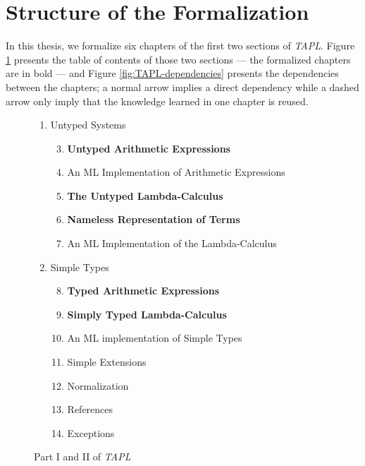 \section{Structure of the Formalization}
\label{sec:structure-of-formalization}

In this thesis, we formalize six chapters of the first two sections of \emph{TAPL}. Figure
\ref{fig:TAPL-toc} presents the table of contents of those two sections --- the formalized chapters
are in bold --- and Figure \ref{fig:TAPL-dependencies} presents the dependencies between the
chapters; a normal arrow implies a direct dependency while a dashed arrow only imply that the
knowledge learned in one chapter is reused.

\begin{figure}[h]
  \footnotesize
  \centering
  \begin{varwidth}{\textwidth}
    \begin{enumerate}[label=\Roman*]
      \itemsep 1pt
      \item Untyped Systems \hfill
        \begin{enumerate}[label=§ \arabic*]
          \setcounter{enumii}{2}
          \item \textbf{Untyped Arithmetic Expressions}
          \item An ML Implementation of Arithmetic Expressions
          \item \textbf{The Untyped Lambda-Calculus}
          \item \textbf{Nameless Representation of Terms}
          \item An ML Implementation of the Lambda-Calculus
        \end{enumerate}
      \item Simple Types \hfill
        \begin{enumerate}[label=§ \arabic*]
          \setcounter{enumii}{7}
          \item \textbf{Typed Arithmetic Expressions}
          \item \textbf{Simply Typed Lambda-Calculus}
          \item An ML implementation of Simple Types
          \item Simple Extensions
          \item Normalization
          \item References
          \item Exceptions
        \end{enumerate}
    \end{enumerate}
  \end{varwidth}
  \caption{Part I and II of \emph{TAPL}}
  \label{fig:TAPL-toc}
\end{figure}

